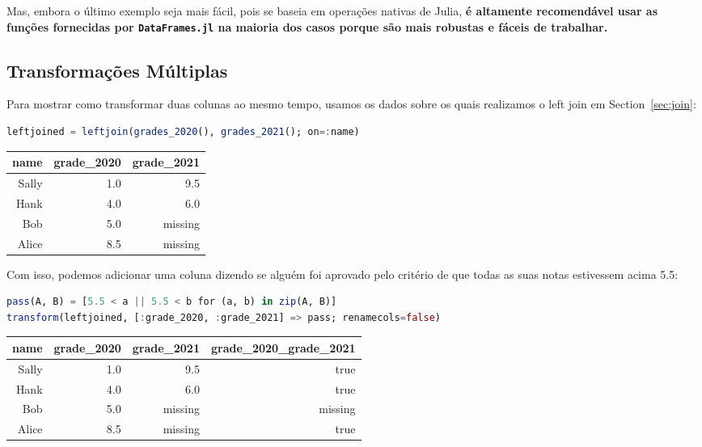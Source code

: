 \documentclass[
  notoc %
]{tufte-book}
\newcommand{\passthrough}[1]{#1}
\begin{document}
Mas, embora o último exemplo seja mais fácil, pois se baseia em
operações nativas de Julia, \textbf{é altamente recomendável usar as
funções fornecidas por \passthrough{\lstinline!DataFrames.jl!} na
maioria dos casos porque são mais robustas e fáceis de trabalhar.}

\hypertarget{sec:multiple_transform}{%
\subsection{Transformações Múltiplas}\label{sec:multiple_transform}}

Para mostrar como transformar duas colunas ao mesmo tempo, usamos os
dados sobre os quais realizamos o left join em Section~\ref{sec:join}:

\begin{lstlisting}[language=Julia]
leftjoined = leftjoin(grades_2020(), grades_2021(); on=:name)
\end{lstlisting}

\begin{longtable}[]{@{}rrr@{}}
\toprule
name & grade\_2020 & grade\_2021 \\
\midrule
\endhead
Sally & 1.0 & 9.5 \\
Hank & 4.0 & 6.0 \\
Bob & 5.0 & missing \\
Alice & 8.5 & missing \\
\bottomrule
\end{longtable}

Com isso, podemos adicionar uma coluna dizendo se alguém foi aprovado
pelo critério de que todas as suas notas estivessem acima 5.5:

\begin{lstlisting}[language=Julia]
pass(A, B) = [5.5 < a || 5.5 < b for (a, b) in zip(A, B)]
transform(leftjoined, [:grade_2020, :grade_2021] => pass; renamecols=false)
\end{lstlisting}

\begin{longtable}[]{@{}rrrr@{}}
\toprule
name & grade\_2020 & grade\_2021 & grade\_2020\_grade\_2021 \\
\midrule
\endhead
Sally & 1.0 & 9.5 & true \\
Hank & 4.0 & 6.0 & true \\
Bob & 5.0 & missing & missing \\
Alice & 8.5 & missing & true \\
\bottomrule
\end{longtable}
\end{document}
